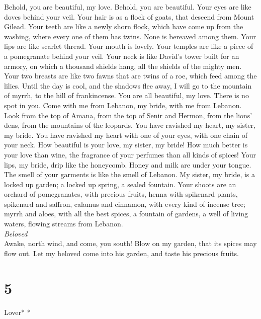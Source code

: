  Behold, you are beautiful, my love. Behold, you are
beautiful. Your eyes are like doves behind your veil. Your hair is as a
flock of goats, that descend from Mount Gilead.  Your
teeth are like a newly shorn flock, which have come up from the washing,
where every one of them has twins. None is bereaved among them.
 Your lips are like scarlet thread. Your mouth is lovely.
Your temples are like a piece of a pomegranate behind your veil.
 Your neck is like David's tower built for an armory, on
which a thousand shields hang, all the shields of the mighty men.
 Your two breasts are like two fawns that are twins of a
roe, which feed among the lilies.  Until the day is cool,
and the shadows flee away, I will go to the mountain of myrrh, to the
hill of frankincense.  You are all beautiful, my love.
There is no spot in you.  Come with me from Lebanon, my
bride, with me from Lebanon. Look from the top of Amana, from the top of
Senir and Hermon, from the lions' dens, from the mountains of the
leopards.  You have ravished my heart, my sister, my
bride. You have ravished my heart with one of your eyes, with one chain
of your neck.  How beautiful is your love, my sister, my
bride! How much better is your love than wine, the fragrance of your
perfumes than all kinds of spices!  Your lips, my bride,
drip like the honeycomb. Honey and milk are under your tongue. The smell
of your garments is like the smell of Lebanon.  My
sister, my bride, is a locked up garden; a locked up spring, a sealed
fountain.  Your shoots are an orchard of pomegranates,
with precious fruits, henna with spikenard plants, 
spikenard and saffron, calamus and cinnamon, with every kind of incense
tree; myrrh and aloes, with all the best spices,  a
fountain of gardens, a well of living waters, flowing streams from
Lebanon.\\
\emph{Beloved}\\
 Awake, north wind, and come, you south! Blow on my
garden, that its spices may flow out. Let my beloved come into his
garden, and taste his precious fruits.

\hypertarget{section-4}{%
\section{5}\label{section-4}}

\emph{\hfill\break
}Lover* *\\

